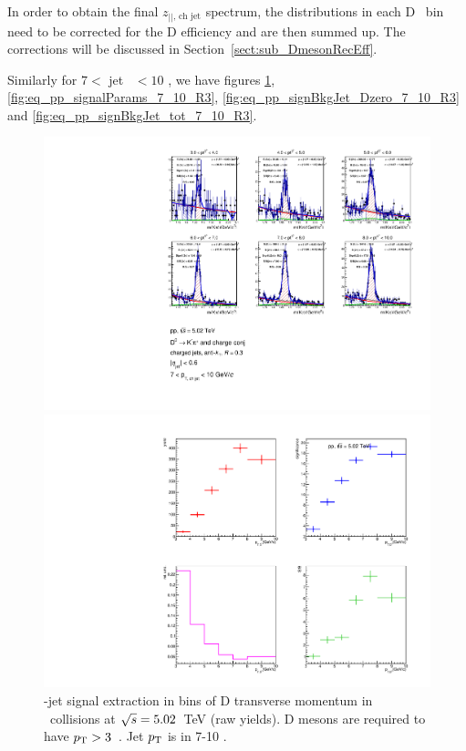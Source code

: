 In order to obtain the final $z_{||\text{, ch jet}}$ spectrum, the distributions in each D \pt\ bin need to be corrected for the D efficiency and are then summed up.
The corrections will be discussed in Section~\ref{sect:sub_DmesonRecEff}.

Similarly for $7<$ jet \pt\ $<10$ \GeVc, we have figures \ref{fig:eq_pp_InvMass_Dzero_7_10_R3}, \ref{fig:eq_pp_signalParams_7_10_R3}, \ref{fig:eq_pp_signBkgJet_Dzero_7_10_R3} and \ref{fig:eq_pp_signBkgJet_tot_7_10_R3}.

\begin{figure}[bth]
\centering
\begin{minipage}{.65\textwidth}
  \centering
  \includegraphics[width=\linewidth]{pp_2sig/R3_jetbin_7_10/invMass_pTD3}
\caption{\Dzero-jet signal extraction in bins of D transverse momentum in \pp\ collisions at $\sqrt{s}=5.02$~TeV (raw yields). D mesons are required to have $p_{\rm T}>3$~\GeVc. Jet $p_{\rm T}$ is in 7-10 \GeVc.
}
\label{fig:eq_pp_InvMass_Dzero_7_10_R3}
\end{minipage}%
\begin{minipage}{.4\textwidth}
  \centering
  \includegraphics[width=\linewidth]{pp_2sig/R3_jetbin_7_10/signalParams_pTD3}

\end{minipage}
\end{figure}
